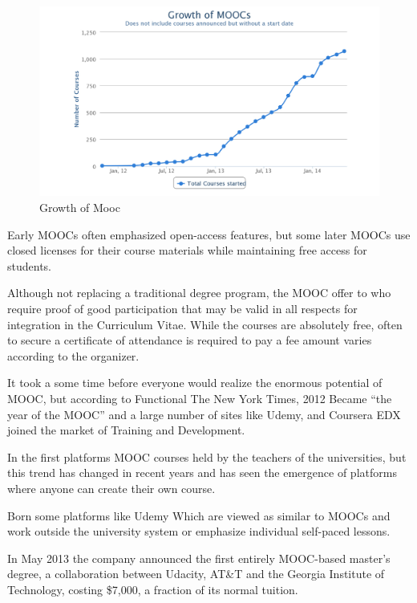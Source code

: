 \begin{figure}[htb] %
 \centering
 \includegraphics[width=0.8\linewidth]{images/chapter1/mooc.jpg}\hfill
 \caption[Growth of Mooc]{Growth of Mooc}
 \label{fig:fourV}
\end{figure}
%
Early MOOCs often emphasized open-access features, but some later MOOCs use closed licenses for their course materials while maintaining free access for students.\cite{mooc_wiki}
%

Although not replacing a traditional degree program, the MOOC offer to who require proof of good participation that may be valid in all respects for integration in the Curriculum Vitae. While the courses are absolutely free, often to secure a certificate of attendance is required to pay a fee amount varies according to the organizer.


It took a some time before everyone would realize the enormous potential of MOOC, but according to Functional The New York Times, 2012 Became “the year of the MOOC” and a large number of sites like Udemy, and Coursera EDX joined the market of Training and Development.

In the first platforms MOOC courses held by the teachers of the universities, but this trend has changed in recent years and has seen the emergence of platforms where anyone can create their own course.

Born some platforms like Udemy Which are viewed as similar to MOOCs and work outside the university system or emphasize individual self-paced lessons.

 In May 2013 the company announced the first entirely MOOC-based master's degree, a collaboration between Udacity, AT\&T and the Georgia Institute of Technology, costing \$7,000, a fraction of its normal tuition.\cite{mooc_wiki}

